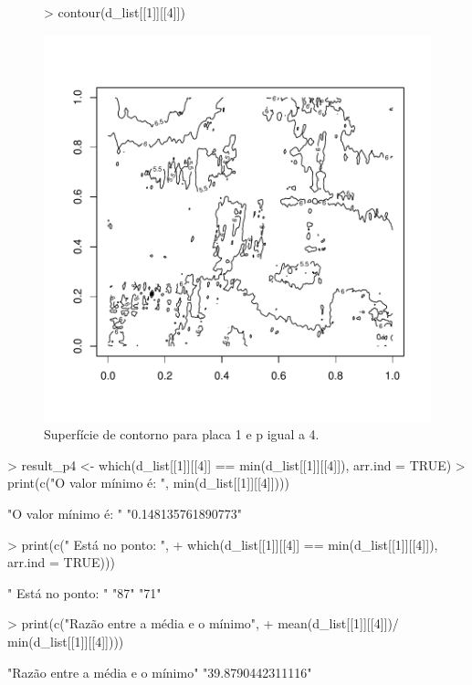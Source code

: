 \documentclass[12pt]{article}
\begin{document}
\begin{figure}
\centering
\begin{Schunk}
\begin{Sinput}
> contour(d_list[[1]][[4]])
\end{Sinput}
\end{Schunk}
\includegraphics{template_matching-013}
\caption{Superfície de contorno para placa 1 e p igual a 4.}
\label{placa1p4}
\end{figure}
\begin{Schunk}
\begin{Sinput}
> result_p4 <- which(d_list[[1]][[4]] == min(d_list[[1]][[4]]), arr.ind = TRUE)
> print(c("O valor mínimo é: ",  min(d_list[[1]][[4]])))
\end{Sinput}
\begin{Soutput}
[1] "O valor mínimo é: " "0.148135761890773" 
\end{Soutput}
\begin{Sinput}
> print(c(" Está no ponto: ",
+         which(d_list[[1]][[4]] == min(d_list[[1]][[4]]), arr.ind = TRUE)))
\end{Sinput}
\begin{Soutput}
[1] " Está no ponto: " "87"               "71"              
\end{Soutput}
\begin{Sinput}
> print(c("Razão entre a média e o mínimo", 
+         mean(d_list[[1]][[4]])/ min(d_list[[1]][[4]])))
\end{Sinput}
\begin{Soutput}
[1] "Razão entre a média e o mínimo" "39.8790442311116"              
\end{Soutput}
\end{Schunk}
\end{document}
